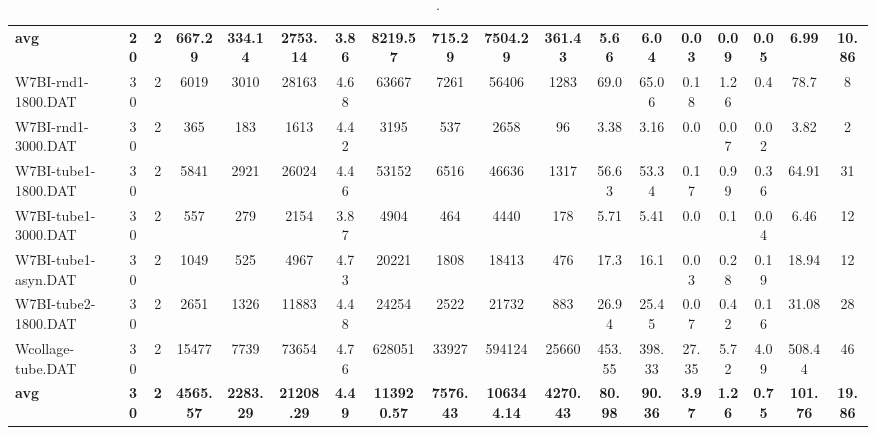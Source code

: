 \begin{sidewaystable}[h]
{\begin{tabular}{lccccccccccccccccc}
\cline{1-18} \textbf{avg} & \textbf{20} & \textbf{2} & \textbf{667.29} & \textbf{334.14} & \textbf{2753.14} & \textbf{3.86} & \textbf{8219.57} & \textbf{715.29} & \textbf{7504.29} & \textbf{361.43} & \textbf{5.66} & \textbf{6.04} & \textbf{0.03} & \textbf{0.09} & \textbf{0.05} & \textbf{6.99} & \textbf{10.86} \\ \cline{1-18}
W7BI-rnd1-1800.DAT & 30 & 2 & 6019 & 3010 & 28163 & 4.68 & 63667 & 7261 & 56406 & 1283 & 69.0 & 65.06 & 0.18 & 1.26 & 0.4 & 78.7 & 8\\
W7BI-rnd1-3000.DAT & 30 & 2 & 365 & 183 & 1613 & 4.42 & 3195 & 537 & 2658 & 96 & 3.38 & 3.16 & 0.0 & 0.07 & 0.02 & 3.82 & 2\\
W7BI-tube1-1800.DAT & 30 & 2 & 5841 & 2921 & 26024 & 4.46 & 53152 & 6516 & 46636 & 1317 & 56.63 & 53.34 & 0.17 & 0.99 & 0.36 & 64.91 & 31\\
W7BI-tube1-3000.DAT & 30 & 2 & 557 & 279 & 2154 & 3.87 & 4904 & 464 & 4440 & 178 & 5.71 & 5.41 & 0.0 & 0.1 & 0.04 & 6.46 & 12\\
W7BI-tube1-asyn.DAT & 30 & 2 & 1049 & 525 & 4967 & 4.73 & 20221 & 1808 & 18413 & 476 & 17.3 & 16.1 & 0.03 & 0.28 & 0.19 & 18.94 & 12\\
W7BI-tube2-1800.DAT & 30 & 2 & 2651 & 1326 & 11883 & 4.48 & 24254 & 2522 & 21732 & 883 & 26.94 & 25.45 & 0.07 & 0.42 & 0.16 & 31.08 & 28\\
Wcollage-tube.DAT & 30 & 2 & 15477 & 7739 & 73654 & 4.76 & 628051 & 33927 & 594124 & 25660 & 453.55 & 398.33 & 27.35 & 5.72 & 4.09 & 508.44 & 46\\
\cline{1-18} \textbf{avg} & \textbf{30} & \textbf{2} & \textbf{4565.57} & \textbf{2283.29} & \textbf{21208.29} & \textbf{4.49} & \textbf{113920.57} & \textbf{7576.43} & \textbf{106344.14} & \textbf{4270.43} & \textbf{80.98} & \textbf{90.36} & \textbf{3.97} & \textbf{1.26} & \textbf{0.75} & \textbf{101.76} & \textbf{19.86} \\ \cline{1-18}
\bottomrule
\end{tabular}%
}%
\caption{.}
\label{tab:table_bc_heur_x}
\end{sidewaystable}

